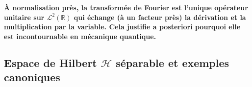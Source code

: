 

{\bf À normalisation près, la transformée de Fourier est l’unique opérateur unitaire sur 
\bf {$\mathcal L^2(\mathbb R)$} qui échange (à un facteur près) la dérivation et la multiplication par la variable.
\smallskip 
Cela justifie a posteriori pourquoi elle est incontournable en mécanique quantique.}


\subsection{Espace de Hilbert ${\mathscr H}$ séparable et exemples canoniques} 

